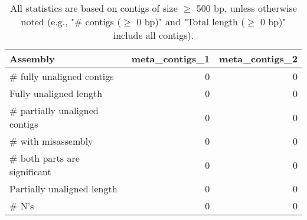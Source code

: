 \documentclass[12pt,a4paper]{article}
\begin{document}
\begin{table}[ht]
\begin{center}
\caption{All statistics are based on contigs of size $\geq$ 500 bp, unless otherwise noted (e.g., "\# contigs ($\geq$ 0 bp)" and "Total length ($\geq$ 0 bp)" include all contigs).}
\begin{tabular}{|l*{2}{|r}|}
\hline
Assembly & meta\_contigs\_1 & meta\_contigs\_2 \\ \hline
\# fully unaligned contigs & 0 & 0 \\ \hline
Fully unaligned length & 0 & 0 \\ \hline
\# partially unaligned contigs & 0 & 0 \\ \hline
\hspace{5mm}\# with misassembly & 0 & 0 \\ \hline
\hspace{5mm}\# both parts are significant & 0 & 0 \\ \hline
Partially unaligned length & 0 & 0 \\ \hline
\# N's & 0 & 0 \\ \hline
\end{tabular}
\end{center}
\end{table}
\end{document}
